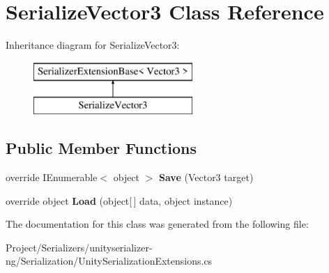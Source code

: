 \hypertarget{class_serialize_vector3}{}\section{Serialize\+Vector3 Class Reference}
\label{class_serialize_vector3}
Inheritance diagram for Serialize\+Vector3\+:\begin{figure}[H]
\begin{center}
\leavevmode
\includegraphics[height=2.000000cm]{class_serialize_vector3}
\end{center}
\end{figure}
\subsection*{Public Member Functions}
\begin{DoxyCompactItemize}
\item 
\mbox{\label{class_serialize_vector3_a005d95ae45a7c705f995c23c95efecdc}} 
override I\+Enumerable$<$ object $>$ {\bfseries Save} (Vector3 target)
\item 
\mbox{\label{class_serialize_vector3_afe202cbbd524fb146e0a4ff17d6b0e62}} 
override object {\bfseries Load} (object\mbox{[}$\,$\mbox{]} data, object instance)
\end{DoxyCompactItemize}


The documentation for this class was generated from the following file\+:\begin{DoxyCompactItemize}
\item 
Project/\+Serializers/unityserializer-\/ng/\+Serialization/Unity\+Serialization\+Extensions.\+cs\end{DoxyCompactItemize}
